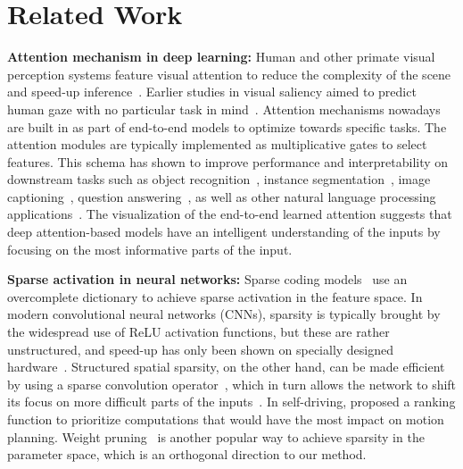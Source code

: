 \section{Related Work}
\textbf{Attention mechanism in deep learning:}
Human and other primate visual perception systems feature visual attention to reduce the complexity
of the scene and speed-up inference~\cite{neurobiology,saliencyvisattend}. Earlier studies in visual
saliency aimed to predict human gaze with no particular task in mind~\cite{predicthuman}. Attention
mechanisms nowadays are built in as  part of  end-to-end models to optimize towards specific tasks.
The attention modules are typically implemented as multiplicative gates to select features. This
schema has shown to improve performance and interpretability on downstream tasks such as object
recognition~\cite{visattend,attendrbm,resattn}, instance segmentation~\cite{recattend}, image
captioning~\cite{showattendtell}, question answering~\cite{coattend,san}, as well as other natural language processing applications~\cite{machinetrans,transformer,bert}. The visualization of
the end-to-end learned attention suggests that deep attention-based models have an intelligent
understanding of the inputs by focusing on the most informative parts of the input.

\textbf{Sparse activation in neural networks:}
Sparse coding models~\cite{sparsecoding} use an
overcomplete dictionary to achieve sparse activation in the feature space. In modern convolutional neural networks (CNNs), sparsity
is typically brought by the widespread use of ReLU activation functions, but these
are rather unstructured, and speed-up has only been shown on specially designed
hardware~\cite{cnvlutin,relusparse}. Structured spatial sparsity, on the other hand, can be made
efficient by using a sparse convolution operator~\cite{perforatedcnn,sbnet,submanifold}, which in turn allows the
network to shift its focus on more difficult parts of the
inputs~\cite{adaptivecomp,nopixelequal,sbnet,pag}. In self-driving, \cite{prioritize} proposed a ranking
function to prioritize computations that would have the most impact on motion planning. Weight
pruning~\cite{sparsecnn,netslim} is another popular way to achieve sparsity in the parameter space,
which is an orthogonal direction to our  method.

